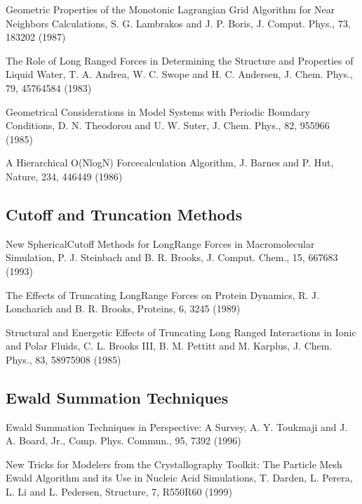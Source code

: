 \documentclass[letterpaper,11pt,english]{sphinxmanual}
\begin{document}
\sphinxAtStartPar
Geometric Properties of the Monotonic Lagrangian Grid Algorithm for Near Neighbors Calculations, S. G. Lambrakos and J. P. Boris, J. Comput. Phys., 73, 183\sphinxhyphen{}202 (1987)

\sphinxAtStartPar
The Role of Long Ranged Forces in Determining the Structure and Properties of Liquid Water, T. A. Andrea, W. C. Swope and H. C. Andersen, J. Chem. Phys., 79, 4576\sphinxhyphen{}4584 (1983)

\sphinxAtStartPar
Geometrical Considerations in Model Systems with Periodic Boundary Conditions, D. N. Theodorou and U. W. Suter, J. Chem. Phys., 82, 955\sphinxhyphen{}966 (1985)

\sphinxAtStartPar
A Hierarchical O(NlogN) Force\sphinxhyphen{}calculation Algorithm, J. Barnes and P. Hut, Nature, 234, 446\sphinxhyphen{}449 (1986)


\subsection{Cutoff and Truncation Methods}
\label{\detokenize{text/references:cutoff-and-truncation-methods}}
\sphinxAtStartPar
New Spherical\sphinxhyphen{}Cutoff Methods for Long\sphinxhyphen{}Range Forces in Macromolecular Simulation, P. J. Steinbach and B. R. Brooks, J. Comput. Chem., 15, 667\sphinxhyphen{}683 (1993)

\sphinxAtStartPar
The Effects of Truncating Long\sphinxhyphen{}Range Forces on Protein Dynamics, R. J. Loncharich and B. R. Brooks, Proteins, 6, 32\sphinxhyphen{}45 (1989)

\sphinxAtStartPar
Structural and Energetic Effects of Truncating Long Ranged Interactions in Ionic and Polar Fluids, C. L. Brooks III, B. M. Pettitt and M. Karplus, J. Chem. Phys., 83, 5897\sphinxhyphen{}5908 (1985)


\subsection{Ewald Summation Techniques}
\label{\detokenize{text/references:ewald-summation-techniques}}
\sphinxAtStartPar
Ewald Summation Techniques in Perspective: A Survey, A. Y. Toukmaji and J. A. Board, Jr., Comp. Phys. Commun., 95, 73\sphinxhyphen{}92 (1996)

\sphinxAtStartPar
New Tricks for Modelers from the Crystallography Toolkit: The Particle Mesh Ewald Algorithm and its Use in Nucleic Acid Simulations, T. Darden, L. Perera, L. Li and L. Pedersen, Structure, 7, R550\sphinxhyphen{}R60 (1999)
\end{document}
